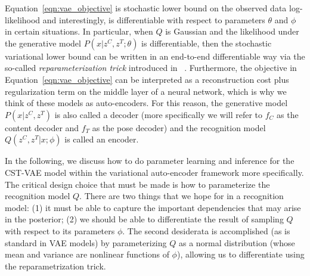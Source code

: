 Equation~\ref{eqn:vae_objective} is stochastic lower bound on the observed data log-likelihood and interestingly,
is differentiable with respect to parameters $\theta$ and $\phi$ in certain situations. In particular,
when $Q$ is Gaussian and the likelihood under the generative model $P(x|z^C,z^T; \theta)$ is differentiable, 
then the stochastic variational lower bound can be written in an end-to-end
differentiable way via the so-called \emph{reparameterization trick} introduced in ~\cite{Kingma2014}.
Furthermore, the objective in Equation~\ref{eqn:vae_objective} can be interpreted as a reconstruction cost plus regularization term on the middle layer
of a neural network, which is why we think of these models as auto-encoders.  
For this reason, the generative model $P(x|z^C, z^T )$ is also called a decoder (more specifically we will
refer to $f_C$ as the content decoder and $f_T$ as the pose decoder) and the recognition model $Q(z^C, z^T|x;\phi)$
is called an encoder.

In the following, we discuss how to do parameter learning and inference for the CST-VAE model
within the variational auto-encoder framework more specifically.
The critical design choice that must be made is how to parameterize  the recognition model $Q$. There are two things 
that we hope for in a recognition model: (1) it must be able to 
capture the important dependencies that may arise in the posterior; (2) we should be able to differentiate the result of
sampling $Q$ with respect to its parameters $\phi$.  The second desiderata is accomplished (as is standard in VAE models)
by parameterizing $Q$ as a normal distribution (whose mean and variance are nonlinear functions of $\phi$), allowing us to differentiate using the 
reparametrization trick.  











